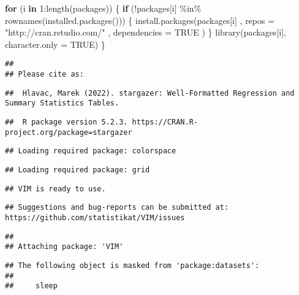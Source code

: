 \documentclass[
]{article}
\newenvironment{Shaded}{\begin{snugshade}}{\end{snugshade}}
\newcommand{\AttributeTok}[1]{\textcolor[rgb]{0.77,0.63,0.00}{#1}}
\newcommand{\ConstantTok}[1]{\textcolor[rgb]{0.00,0.00,0.00}{#1}}
\newcommand{\ControlFlowTok}[1]{\textcolor[rgb]{0.13,0.29,0.53}{\textbf{#1}}}
\newcommand{\DecValTok}[1]{\textcolor[rgb]{0.00,0.00,0.81}{#1}}
\newcommand{\FunctionTok}[1]{\textcolor[rgb]{0.00,0.00,0.00}{#1}}
\newcommand{\NormalTok}[1]{#1}
\newcommand{\SpecialCharTok}[1]{\textcolor[rgb]{0.00,0.00,0.00}{#1}}
\newcommand{\StringTok}[1]{\textcolor[rgb]{0.31,0.60,0.02}{#1}}
\begin{document}
\begin{Shaded}
\begin{Highlighting}[]
\ControlFlowTok{for}\NormalTok{ (i }\ControlFlowTok{in} \DecValTok{1}\SpecialCharTok{:}\FunctionTok{length}\NormalTok{(packages)) \{}
  \ControlFlowTok{if}\NormalTok{ (}\SpecialCharTok{!}\NormalTok{packages[i] }\SpecialCharTok{\%in\%} \FunctionTok{rownames}\NormalTok{(}\FunctionTok{installed.packages}\NormalTok{())) \{}
    \FunctionTok{install.packages}\NormalTok{(packages[i]}
\NormalTok{                     , }\AttributeTok{repos =} \StringTok{"http://cran.rstudio.com/"}
\NormalTok{                     , }\AttributeTok{dependencies =} \ConstantTok{TRUE}
\NormalTok{                     )}
\NormalTok{  \}}
  \FunctionTok{library}\NormalTok{(packages[i], }\AttributeTok{character.only =} \ConstantTok{TRUE}\NormalTok{)}
\NormalTok{\}}
\end{Highlighting}
\end{Shaded}

\begin{verbatim}
## 
## Please cite as:
\end{verbatim}

\begin{verbatim}
##  Hlavac, Marek (2022). stargazer: Well-Formatted Regression and Summary Statistics Tables.
\end{verbatim}

\begin{verbatim}
##  R package version 5.2.3. https://CRAN.R-project.org/package=stargazer
\end{verbatim}

\begin{verbatim}
## Loading required package: colorspace
\end{verbatim}

\begin{verbatim}
## Loading required package: grid
\end{verbatim}

\begin{verbatim}
## VIM is ready to use.
\end{verbatim}

\begin{verbatim}
## Suggestions and bug-reports can be submitted at: https://github.com/statistikat/VIM/issues
\end{verbatim}

\begin{verbatim}
## 
## Attaching package: 'VIM'
\end{verbatim}

\begin{verbatim}
## The following object is masked from 'package:datasets':
## 
##     sleep
\end{verbatim}
\end{document}
